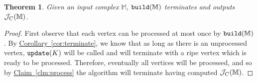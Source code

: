 \documentclass[11pt]{article}
\newcommand{\ignore}[1]{}
\newtheorem{theorem}{Theorem}
\newtheorem{claim}[theorem]{Claim}
\theoremstyle{definition}
\newcommand{\cJ}{{\cal J}}
\newcommand{\MM}{\mathbb{M}}
\newcommand{\PP}{\mathbb{P}}
\newcommand{\eps}{\varepsilon}
\newcommand{\Clm}[1]{\hyperref[clm:#1]{Claim~\ref*{clm:#1}}} %
\newcommand{\Lem}[1]{\hyperref[lem:#1]{Lemma~\ref*{lem:#1}}} %
\newcommand{\Cor}[1]{\hyperref[cor:#1]{Corollary~\ref*{cor:#1}}} %
\newcommand{\build}{{\tt build}}
\newcommand{\col}{col}
\newcommand{\fcol}{full}
\newcommand{\jc}{\cJ_C}
\newcommand{\rep}{rep}
\newcommand{\st}{K}
\newcommand{\update}{{\tt update}}
\begin{document}
\begin{theorem}
 Given an input complex $\MM$, $\build(\MM)$ terminates and outputs $\jc(\MM)$.
\end{theorem}
\begin{proof}
 First observe that each vertex can be processed at most once by $\build(\MM)$.  By \Cor{terminate}, we know that as long as there 
 is an unprocessed vertex, $\update(K)$ will be called and will terminate with a ripe vertex which is ready to be processed. 
 Therefore, eventually all vertices will be processed, and so by \Clm{process} the algorithm will terminate having 
 computed $\jc(\MM)$.
\end{proof}

% 
% 
\end{document}
